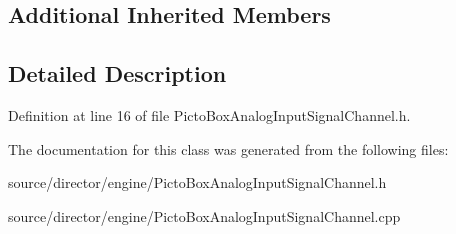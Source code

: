 \subsection*{Additional Inherited Members}


\subsection{Detailed Description}


Definition at line 16 of file Picto\-Box\-Analog\-Input\-Signal\-Channel.\-h.



The documentation for this class was generated from the following files\-:\begin{DoxyCompactItemize}
\item 
source/director/engine/Picto\-Box\-Analog\-Input\-Signal\-Channel.\-h\item 
source/director/engine/Picto\-Box\-Analog\-Input\-Signal\-Channel.\-cpp\end{DoxyCompactItemize}
